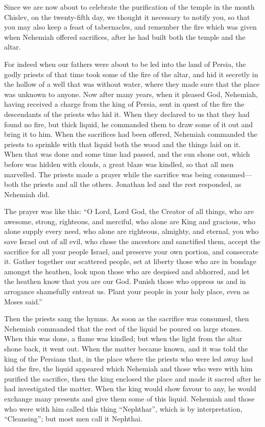  Since we are now about to celebrate the purification of
the temple in the month Chislev, on the twenty-fifth day, we thought it
necessary to notify you, so that you may also keep a feast of
tabernacles, and remember the fire which was given when Nehemiah offered
sacrifices, after he had built both the temple and the altar.

 For indeed when our fathers were about to be led into the
land of Persia, the godly priests of that time took some of the fire of
the altar, and hid it secretly in the hollow of a well that was without
water, where they made sure that the place was unknown to anyone.
 Now after many years, when it pleased God, Nehemiah,
having received a charge from the king of Persia, sent in quest of the
fire the descendants of the priests who hid it. When they declared to us
that they had found no fire, but thick liquid,  he
commanded them to draw some of it out and bring it to him. When the
sacrifices had been offered, Nehemiah commanded the priests to sprinkle
with that liquid both the wood and the things laid on it. 
When that was done and some time had passed, and the sun shone out,
which before was hidden with clouds, a great blaze was kindled, so that
all men marvelled.  The priests made a prayer while the
sacrifice was being consumed---both the priests and all the others.
Jonathan led and the rest responded, as Nehemiah did.

 The prayer was like this: ``O Lord, Lord God, the Creator
of all things, who are awesome, strong, righteous, and merciful, who
alone are King and gracious,  who alone supply every need,
who alone are righteous, almighty, and eternal, you who save Israel out
of all evil, who chose the ancestors and sanctified them, 
accept the sacrifice for all your people Israel, and preserve your own
portion, and consecrate it.  Gather together our scattered
people, set at liberty those who are in bondage amongst the heathen,
look upon those who are despised and abhorred, and let the heathen know
that you are our God.  Punish those who oppress us and in
arrogance shamefully entreat us.  Plant your people in your
holy place, even as Moses said.''

 Then the priests sang the hymns.  As soon as
the sacrifice was consumed, then Nehemiah commanded that the rest of the
liquid be poured on large stones.  When this was done, a
flame was kindled; but when the light from the altar shone back, it went
out.  When the matter became known, and it was told the
king of the Persians that, in the place where the priests who were led
away had hid the fire, the liquid appeared which Nehemiah and those who
were with him purified the sacrifice,  then the king
enclosed the place and made it sacred after he had investigated the
matter.  When the king would show favour to any, he would
exchange many presents and give them some of this liquid. 
Nehemiah and those who were with him called this thing ``Nephthar'',
which is by interpretation, ``Cleansing''; but most men call it
Nephthai.

